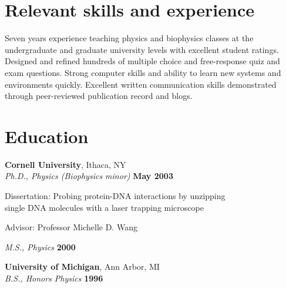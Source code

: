 \documentclass[margin,line]{resume}
\begin{document}
\begin{resume}
    \section{\mysidestyle Relevant skills and experience} 

    Seven years experience teaching physics and biophysics classes at the undergraduate and graduate university levels with excellent student ratings. Designed and refined hundreds of multiple choice and free-response quiz and exam questions. Strong computer skills and ability to learn new systems and environments quickly. Excellent written communication skills demonstrated through peer-reviewed publication record and blogs. 
 
    \section{\mysidestyle Education}

    \textbf{Cornell University}, Ithaca, NY \vspace{2mm}\\\vspace{1mm}%
    \textsl{Ph.D., Physics (Biophysics minor)} \hfill \textbf{ May 2003}\vspace{-3mm}\\\vspace{-1mm}%
    \begin{list2}
        \item Dissertation: Probing protein-DNA interactions by unzipping \\
        single DNA molecules with a laser trapping microscope
        \item Advisor:  Professor Michelle D. Wang
    \end{list2}\vspace{-1.5mm}

    \textsl{M.S., Physics} \hfill \textbf{2000}\\\vspace{0mm}%

    \textbf{University of Michigan}, Ann Arbor, MI \vspace{2mm}\\\vspace{1mm}%
    \textsl{B.S., Honors Physics} \hfill \textbf{1996}\vspace{-3mm}\\\vspace{-1mm}%
    

\end{resume}
\end{document}
